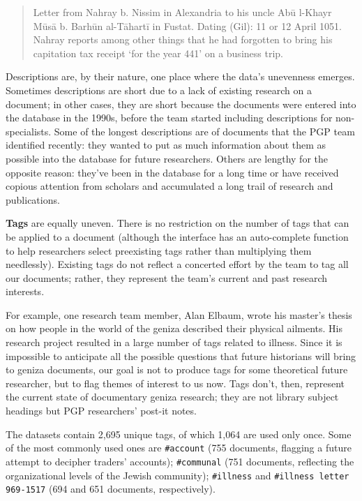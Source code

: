 \documentclass{article}
\def\uniqueTags{2,695}
\def\taggedAccount{755}
\def\taggedCommunal{751}
\def\taggedIllness{694}
\def\taggedIllnessLetter{651}
\def\singletonTags{1,064}
\begin{document}
\begin{quote}
Letter from Nahray b. Nissim in Alexandria to his uncle Abū l-Khayr Mūsā b. Barhūn al-Tāhartī in Fustat. Dating (Gil): 11 or 12 April 1051. Nahray reports among other things that he had forgotten to bring his capitation tax receipt ‘for the year 441’ on a business trip. \autocite{noauthor_letter_1050}
\end{quote}
Descriptions are, by their nature, one place where the data’s unevenness emerges. Sometimes descriptions are short due to a lack of existing research on a document; in other cases, they are short because the documents were entered into the database in the 1990s, before the team started including descriptions for non-specialists. Some of the longest descriptions are of documents that the PGP team identified recently: they wanted to put as much information about them as possible into the database for future researchers. Others are lengthy for the opposite reason: they’ve been in the database for a long time or have received copious attention from scholars and accumulated a long trail of research and publications. 

\textbf{Tags} are equally uneven. There is no restriction on the number of tags that can be applied to a document (although the interface has an auto-complete function to help researchers select preexisting tags rather than multiplying them needlessly). Existing tags do not reflect a concerted effort by the team to tag all our documents; rather, they represent the team's current and past research interests. 

For example, one research team member, Alan Elbaum, wrote his master’s thesis on how people in the world of the geniza described their physical ailments. His research project resulted in a large number of tags related to illness. Since it is impossible to anticipate all the possible questions that future historians will bring to geniza documents, our goal is not to produce tags for some theoretical future researcher, but to flag themes of interest to us now. Tags don’t, then, represent the current state of documentary geniza research; they are not library subject headings but PGP researchers’ post-it notes.

The datasets contain \uniqueTags\hspace{0.25ex} unique tags, of which \singletonTags\hspace{0.25ex} are used only once. Some of the most commonly used ones are \texttt{\#account} (\taggedAccount\hspace{0.25ex} documents, flagging a future attempt to decipher traders’ accounts); \texttt{\#communal} (\taggedCommunal\hspace{0.25ex} documents, reflecting the organizational levels of the Jewish community); \texttt{\#illness} and \texttt{\#illness letter 969-1517}  (\taggedIllness\hspace{0.25ex} and \taggedIllnessLetter\hspace{0.25ex} documents, respectively). 
\end{document}
